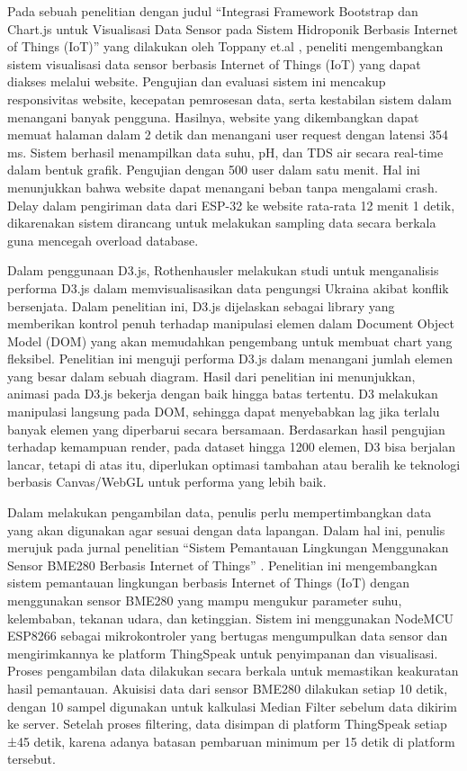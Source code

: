 Pada sebuah penelitian dengan judul “Integrasi Framework Bootstrap dan Chart.js untuk Visualisasi Data Sensor pada Sistem Hidroponik Berbasis Internet of Things (IoT)” yang dilakukan oleh Toppany et.al \cite{Toppany2023}, peneliti mengembangkan sistem visualisasi data sensor berbasis Internet of Things (IoT) yang dapat diakses melalui website. Pengujian dan evaluasi sistem ini mencakup responsivitas website, kecepatan pemrosesan data, serta kestabilan sistem dalam menangani banyak pengguna. Hasilnya, website yang dikembangkan dapat memuat halaman dalam 2 detik dan menangani user request dengan latensi 354 ms. Sistem berhasil menampilkan data suhu, pH, dan TDS air secara real-time dalam bentuk grafik. Pengujian dengan 500 user dalam satu menit. Hal ini menunjukkan bahwa website dapat menangani beban tanpa mengalami crash. Delay dalam pengiriman data dari ESP-32 ke website rata-rata 12 menit 1 detik, dikarenakan sistem dirancang untuk melakukan sampling data secara berkala guna mencegah overload database. 

Dalam penggunaan D3.js, Rothenhausler \cite{Rothenhausler2022} melakukan studi untuk menganalisis performa D3.js dalam memvisualisasikan data pengungsi Ukraina akibat konflik bersenjata. Dalam penelitian ini, D3.js dijelaskan sebagai library yang memberikan kontrol penuh terhadap manipulasi elemen dalam Document Object Model (DOM) yang akan memudahkan pengembang untuk membuat chart yang fleksibel. Penelitian ini menguji performa D3.js dalam menangani jumlah elemen yang besar dalam sebuah diagram. Hasil dari penelitian ini menunjukkan, animasi pada D3.js bekerja dengan baik hingga batas tertentu. D3 melakukan manipulasi langsung pada DOM, sehingga dapat menyebabkan lag jika terlalu banyak elemen yang diperbarui secara bersamaan. Berdasarkan hasil pengujian terhadap kemampuan render, pada dataset hingga 1200 elemen, D3 bisa berjalan lancar, tetapi di atas itu, diperlukan optimasi tambahan atau beralih ke teknologi berbasis Canvas/WebGL untuk performa yang lebih baik. 

Dalam melakukan pengambilan data, penulis perlu mempertimbangkan data yang akan digunakan agar sesuai dengan data lapangan. Dalam hal ini, penulis merujuk pada jurnal penelitian “Sistem Pemantauan Lingkungan Menggunakan Sensor BME280 Berbasis Internet of Things” \cite{Triawan2023}. Penelitian ini mengembangkan sistem pemantauan lingkungan berbasis Internet of Things (IoT) dengan menggunakan sensor BME280 yang mampu mengukur parameter suhu, kelembaban, tekanan udara, dan ketinggian. Sistem ini menggunakan NodeMCU ESP8266 sebagai mikrokontroler yang bertugas mengumpulkan data sensor dan mengirimkannya ke platform ThingSpeak untuk penyimpanan dan visualisasi. Proses pengambilan data dilakukan secara berkala untuk memastikan keakuratan hasil pemantauan. Akuisisi data dari sensor BME280 dilakukan setiap 10 detik, dengan 10 sampel digunakan untuk kalkulasi Median Filter sebelum data dikirim ke server. Setelah proses filtering, data disimpan di platform ThingSpeak setiap ±45 detik, karena adanya batasan pembaruan minimum per 15 detik di platform tersebut. 

